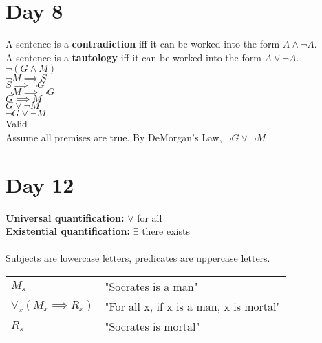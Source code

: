\documentclass{article}
\begin{document}
	\section{Day 8}
	A sentence is a \textbf{contradiction} iff it can be worked into the form $A \land \lnot A$. \\
	A sentence is a \textbf{tautology} iff it can be worked into the form $A \lor \lnot A$. \\
	$\lnot (G \land M)$\\
	$\lnot M \implies S$\\
	$S \implies \lnot G$\\
	$\lnot M \implies \lnot G$\\
	$G \implies M$\\
	$G \lor \lnot M$\\
	$\lnot G \lor \lnot M$\\
	Valid\\
	Assume all premises are true. By DeMorgan's Law, $\lnot G \lor \lnot M$ 
	\section{Day 12}
	\textbf{Universal quantification:} $\forall$ for all \\
	\textbf{Existential quantification:} $\exists$ there exists\\
	\\
	Subjects are lowercase letters, predicates are uppercase letters.\\
	\begin{tabular}{l l}
		$M_s$ & "Socrates is a man"\\	
		$\forall _x(M_x \implies R_x)$ & "For all x, if x is a man, x is mortal"\\ \hline
		$R_s$ & "Socrates is mortal"
	\end{tabular}
\end{document}
